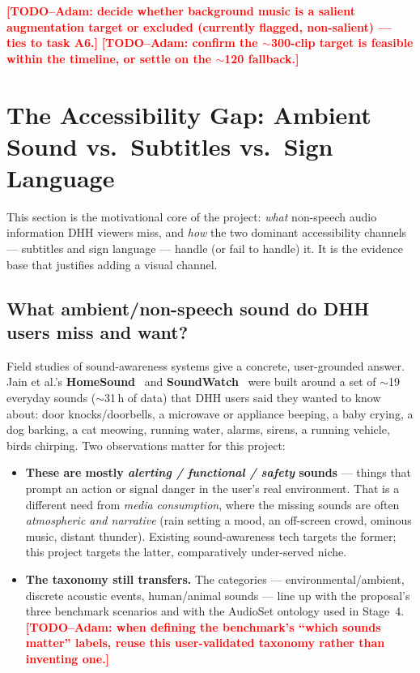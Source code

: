 \documentclass[11pt,a4paper]{article}
\newcommand{\TODO}[1]{\textcolor{red}{\textbf{[TODO--Adam: #1]}}}
\begin{document}
\smallskip
\noindent\TODO{decide whether background music is a salient augmentation target or excluded
(currently flagged, non-salient) --- ties to task A6.}
\TODO{confirm the $\sim$300-clip target is feasible within the timeline, or settle on the $\sim$120
fallback.}

\section{The Accessibility Gap: Ambient Sound vs.\ Subtitles vs.\ Sign Language}\label{sec:gap}
This section is the motivational core of the project: \emph{what} non-speech audio information DHH
viewers miss, and \emph{how} the two dominant accessibility channels --- subtitles and sign language
--- handle (or fail to handle) it. It is the evidence base that justifies adding a visual channel.

\subsection{What ambient/non-speech sound do DHH users miss and want?}
Field studies of sound-awareness systems give a concrete, user-grounded answer. Jain et al.'s
\textbf{HomeSound}~\cite{homesound} and \textbf{SoundWatch}~\cite{soundwatch} were built around a set
of $\sim$19 everyday sounds ($\sim$31\,h of data) that DHH users said they wanted to know about:
door knocks/doorbells, a microwave or appliance beeping, a baby crying, a dog barking, a cat
meowing, running water, alarms, sirens, a running vehicle, birds chirping. Two observations matter
for this project:
\begin{itemize}
  \item \textbf{These are mostly \emph{alerting / functional / safety} sounds} --- things that
    prompt an action or signal danger in the user's real environment. That is a different need from
    \emph{media consumption}, where the missing sounds are often \emph{atmospheric and narrative}
    (rain setting a mood, an off-screen crowd, ominous music, distant thunder). Existing
    sound-awareness tech targets the former; this project targets the latter, comparatively
    under-served niche.
  \item \textbf{The taxonomy still transfers.} The categories --- environmental/ambient, discrete
    acoustic events, human/animal sounds --- line up with the proposal's three benchmark scenarios
    and with the AudioSet ontology used in Stage~4. \TODO{when defining the benchmark's ``which
    sounds matter'' labels, reuse this user-validated taxonomy rather than inventing one.}
\end{itemize}
\end{document}
